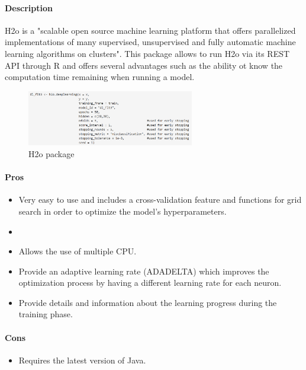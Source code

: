 \documentclass[6pt,letter]{article}\usepackage[]{graphicx}\usepackage[]{color}
\begin{document}
\paragraph{Description}
H2o is a "scalable open source machine learning platform that offers parallelized implementations of many supervised, unsupervised and fully automatic machine learning algorithms on clusters". This package allows to run H2o via its REST API through R and offers several advantages such as the ability ot know the computation time remaining when running a model.
\begin{figure}[h]
    \centering
    \includegraphics[width=0.65\textwidth]{figure/h2o_package.png}
     \caption{H2o package}
\end{figure}

\paragraph{Pros}
\begin{itemize}
\item Very easy to use and includes a cross-validation feature and functions for grid search in order to optimize the model's hyperparameters.
\item 
\item Allows the use of multiple CPU.
\item Provide an adaptive learning rate (ADADELTA) which improves the optimization process by having a different learning rate for each neuron.
\item Provide details and information about the learning progress during the training phase.
\end{itemize}
\paragraph{Cons}
\begin{itemize}
\item Requires the latest version of Java.
\end{itemize}

\end{document}
